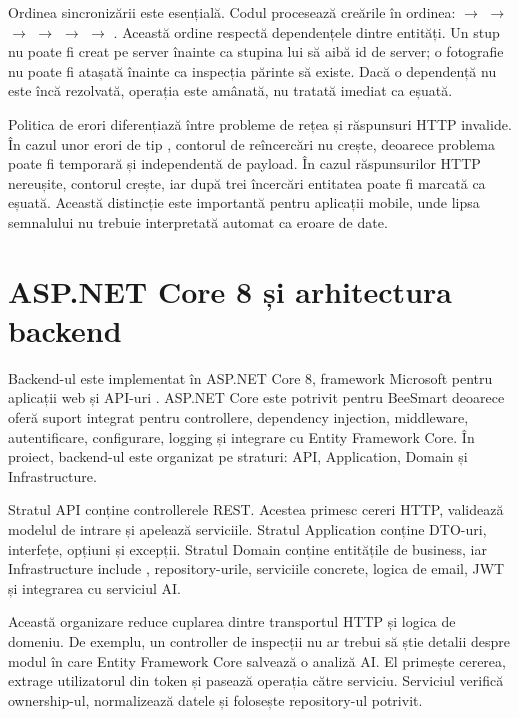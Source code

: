 Ordinea sincronizării este esențială. Codul procesează creările în ordinea:  \(\rightarrow\)  \(\rightarrow\)  \(\rightarrow\)  \(\rightarrow\)  \(\rightarrow\)  \(\rightarrow\) . Această ordine respectă dependențele dintre entități. Un stup nu poate fi creat pe server înainte ca stupina lui să aibă id de server; o fotografie nu poate fi atașată înainte ca inspecția părinte să existe. Dacă o dependență nu este încă rezolvată, operația este amânată, nu tratată imediat ca eșuată.

Politica de erori diferențiază între probleme de rețea și răspunsuri HTTP invalide. În cazul unor erori de tip , contorul de reîncercări nu crește, deoarece problema poate fi temporară și independentă de payload. În cazul răspunsurilor HTTP nereușite, contorul crește, iar după trei încercări entitatea poate fi marcată ca eșuată. Această distincție este importantă pentru aplicații mobile, unde lipsa semnalului nu trebuie interpretată automat ca eroare de date.

\section{ASP.NET Core 8 și arhitectura backend}

Backend-ul este implementat în ASP.NET Core 8, framework Microsoft pentru aplicații web și API-uri \cite{aspnetCoreDocs}. ASP.NET Core este potrivit pentru BeeSmart deoarece oferă suport integrat pentru controllere, dependency injection, middleware, autentificare, configurare, logging și integrare cu Entity Framework Core. În proiect, backend-ul este organizat pe straturi: API, Application, Domain și Infrastructure.

Stratul API conține controllerele REST. Acestea primesc cereri HTTP, validează modelul de intrare și apelează serviciile. Stratul Application conține DTO-uri, interfețe, opțiuni și excepții. Stratul Domain conține entitățile de business, iar Infrastructure include , repository-urile, serviciile concrete, logica de email, JWT și integrarea cu serviciul AI.

Această organizare reduce cuplarea dintre transportul HTTP și logica de domeniu. De exemplu, un controller de inspecții nu ar trebui să știe detalii despre modul în care Entity Framework Core salvează o analiză AI. El primește cererea, extrage utilizatorul din token și pasează operația către serviciu. Serviciul verifică ownership-ul, normalizează datele și folosește repository-ul potrivit.


